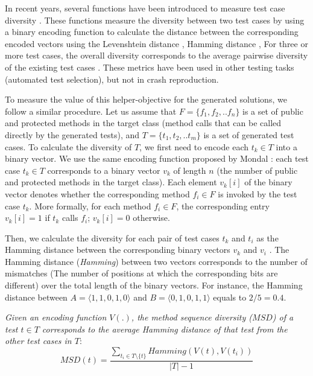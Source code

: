 In recent years, several functions have been introduced to measure test case diversity \cite{mondal2015}. These functions measure the diversity between two test cases by using a binary encoding function to calculate the distance between the corresponding encoded vectors using the Levenshtein distance \cite{Levenshtein1966}, Hamming distance \cite{Hamming1950}, \etc
For three or more test cases, the overall diversity corresponds to the average pairwise diversity of the existing test cases \cite{mondal2015}. These metrics have been used in other testing tasks (\eg automated test selection), but not in crash reproduction. 


To measure the value of this helper-objective for the generated solutions, we follow a similar procedure. Let us assume that $F=\{f_1, f_2, ..f_n\}$ is a set of public and protected methods in the target class (\ie method calls that can be called directly by the generated tests), and $T=\{t_1, t_2, ..t_m\}$ is a set of generated test cases.
To calculate the diversity of $T$, we first need to encode each $t_k \in T$ into a binary vector. We use the same encoding function proposed by Mondal \etal \cite{mondal2015}: each test case $t_k \in T$ corresponds to a binary vector $v_k$ of length  $n$ (\ie the number of public and protected methods in the target class). Each element $v_k[i]$ of the binary vector denotes whether the corresponding method $f_i\in F$ is invoked by the test case $t_k$. More formally, for each method $f_i \in F$,  the corresponding entry $v_k[i]=1$ if $t_k$ calls $f_i$;  $v_k[i]=0$ otherwise.

Then, we calculate the diversity for each pair of test cases $t_k$ and $t_i$ as the Hamming distance between the corresponding binary vectors  $v_k$ and $v_i$  \cite{Hamming1950}. 
The Hamming distance (\textit{Hamming}) between two vectors corresponds to the number of mismatches (The number of positions at which the corresponding bits are different) over the total length of the binary vectors. For instance, the Hamming distance between $A=\langle1,1,0,1,0\rangle$ and $B=\langle0,1,0,1,1\rangle$ equals to $2/5= 0.4$. 

\begin{definition}
\textit{Given an encoding function $V(.)$, the method sequence diversity ($MSD$) of a test $t \in T$ corresponds to the average Hamming distance of that test from the other test cases in $T$}:
\begin{equation}
MSD(t)= \frac{\sum_{t_i \in T \setminus \{t\}} Hamming(V(t),V(t_i))}{|T| - 1}
\end{equation}
\end{definition}

